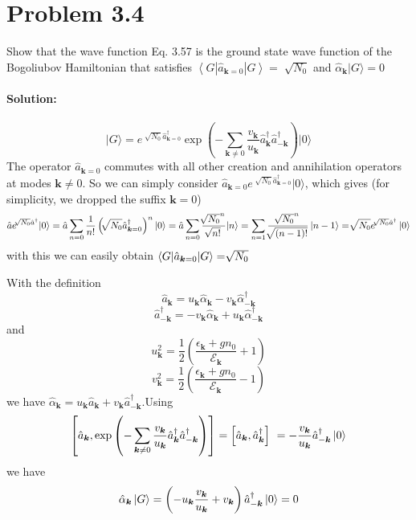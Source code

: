 \section*{Problem 3.4}

\def\k{\bm{k}}

Show that the wave function Eq. 3.57 is the ground state wave function of the Bogoliubov Hamiltonian that satisfies $\left\langle G\left\lvert \hat{a}_{\k =0}\right\rvert G\right\rangle =\sqrt[]{N_0}$ and $\hat{\alpha}_{\k }\vert G\rangle =0$
\paragraph*{Solution:}
\begin{equation}
    \vert G\rangle  = e^{\sqrt[]{N_0}\hat{a}^{\dagger}_{\k =0}}\exp\left(-\sum_{\k \neq 0}\frac{v_{\k} }{u_{\k} }\hat{a}^{\dagger}_{\k} \hat{a}^{\dagger}_{-\k} \right)\vert 0 \rangle
\end{equation}
The operator $\hat{a}_{\k =0}$ commutes with all other creation and annihilation operators at modes $\k  \neq 0$. So we can simply consider $\hat{a}_{\k =0}e^{\sqrt[]{N_0}\hat{a}^{\dagger}_{\k =0}}\vert 0 \rangle$, which gives (for simplicity, we dropped the suffix $\k =0$)
\begin{equation}
    \hat{a}e^{\sqrt[]{N_0}\hat{a}^{\dagger}}\vert 0 \rangle = \hat{a}\sum_{n=0}\frac{1}{n!}\left(\sqrt[]{N_0}\hat{a}^{\dagger}_{\k =0}\right)^n\vert 0 \rangle = \hat{a}\sum_{n=0}\frac{\sqrt[]{N_0}^n}{\sqrt[]{n!}}\vert n \rangle =\sum_{n=1}\frac{\sqrt[]{N_0}^n}{\sqrt[]{(n-1)!}}\ket{n-1} = \sqrt[]{N_0}e^{\sqrt[]{N_0}\hat{a}^{\dagger}}\ket{0}
\end{equation}
with this we can easily obtain $ \braket{G|\hat{a}_{\k =0}|G} = \sqrt[]{N_0} $

With the definition 
\begin{equation}
    \hat{a}_{\k } = u_{\k } \hat{\alpha}_{\k } - v_{\k } \hat{\alpha}^{\dagger}_{-\k}
\end{equation}
\begin{equation}
    \hat{a}^{\dagger}_{-\k} = -v_{\k } \hat{\alpha}_{\k } + u_{\k } \hat{\alpha}^{\dagger}_{-\k}
\end{equation}
and
\begin{equation}
    u^2_{\k } = \frac{1}{2}\left(\frac{\epsilon _{\k }+gn_0}{\mathcal{E} _{\k }}+1\right)
\end{equation}
\begin{equation}
    v^2_{\k } = \frac{1}{2}\left(\frac{\epsilon _{\k }+gn_0}{\mathcal{E} _{\k }}-1\right)
\end{equation}
we have $\hat{\alpha}_{\k } = u_{\k }\hat{a}_{\k }+v_{\k }\hat{a}^{\dagger}_{-\k}$.Using 
\begin{equation}
    \left[\hat{a}_{\k },\exp\left(-\sum_{\k \neq 0}\frac{v_{\k} }{u_{\k} }\hat{a}^{\dagger}_{\k} \hat{a}^{\dagger}_{-\k} \right) \right] = \left[\hat{a}_{\k },\hat{a}^{\dagger}_{\k} \right]\ = -\frac{v_{\k} }{u_{\k} }\hat{a}^{\dagger}_{-\k}\ket{0}
\end{equation}
we have
\begin{equation}
    \hat{\alpha}_{\k }\ket{G} =  \left(-u_{\k }\frac{v_{\k} }{u_{\k} }+v_{\k }\right)\hat{a}^{\dagger}_{-\k}\ket{0} = 0
\end{equation}